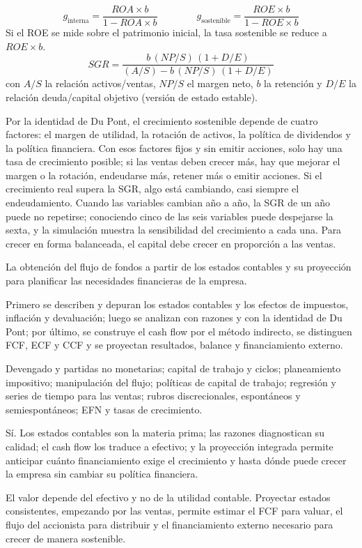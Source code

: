 \begin{formulaBox}
\[
g_{\text{interna}} = \frac{ROA\times b}{1-ROA\times b}
\qquad\qquad
g_{\text{sostenible}} = \frac{ROE\times b}{1-ROE\times b}
\]
Si el ROE se mide sobre el patrimonio inicial, la tasa sostenible se reduce a $ROE\times b$.
\[
SGR = \frac{b\,(NP/S)\,(1+D/E)}{(A/S)-b\,(NP/S)\,(1+D/E)}
\]
con $A/S$ la relación activos/ventas, $NP/S$ el margen neto, $b$ la retención y $D/E$ la relación deuda/capital objetivo (versión de estado estable).
\end{formulaBox}

Por la identidad de Du Pont, el crecimiento sostenible depende de cuatro factores: el margen de utilidad, la rotación de activos, la política de dividendos y la política financiera. Con esos factores fijos y sin emitir acciones, solo hay una tasa de crecimiento posible; si las ventas deben crecer más, hay que mejorar el margen o la rotación, endeudarse más, retener más o emitir acciones. Si el crecimiento real supera la SGR, algo está cambiando, casi siempre el endeudamiento. Cuando las variables cambian año a año, la SGR de un año puede no repetirse; conociendo cinco de las seis variables puede despejarse la sexta, y la simulación muestra la sensibilidad del crecimiento a cada una. Para crecer en forma balanceada, el capital debe crecer en proporción a las ventas.

\begin{control}
La obtención del flujo de fondos a partir de los estados contables y su proyección para planificar las necesidades financieras de la empresa.

Primero se describen y depuran los estados contables y los efectos de impuestos, inflación y devaluación; luego se analizan con razones y con la identidad de Du Pont; por último, se construye el cash flow por el método indirecto, se distinguen FCF, ECF y CCF y se proyectan resultados, balance y financiamiento externo.

Devengado y partidas no monetarias; capital de trabajo y ciclos; planeamiento impositivo; manipulación del flujo; políticas de capital de trabajo; regresión y series de tiempo para las ventas; rubros discrecionales, espontáneos y semiespontáneos; EFN y tasas de crecimiento.

Sí. Los estados contables son la materia prima; las razones diagnostican su calidad; el cash flow los traduce a efectivo; y la proyección integrada permite anticipar cuánto financiamiento exige el crecimiento y hasta dónde puede crecer la empresa sin cambiar su política financiera.

El valor depende del efectivo y no de la utilidad contable. Proyectar estados consistentes, empezando por las ventas, permite estimar el FCF para valuar, el flujo del accionista para distribuir y el financiamiento externo necesario para crecer de manera sostenible.
\end{control}


